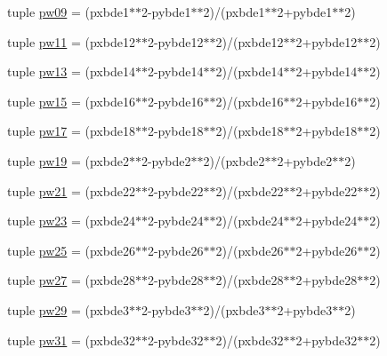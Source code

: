 \begin{DoxyCompactItemize}
tuple \mbox{\hyperlink{namespacewBDE_a9fdd797a1cbfd9f2e684cd7f94bb5d36}{pw09}} = (pxbde1$\ast$$\ast$2-\/pybde1$\ast$$\ast$2)/(pxbde1$\ast$$\ast$2+pybde1$\ast$$\ast$2)
\item 
tuple \mbox{\hyperlink{namespacewBDE_ac7ada708cdce762ea53266a496005a6b}{pw11}} = (pxbde12$\ast$$\ast$2-\/pybde12$\ast$$\ast$2)/(pxbde12$\ast$$\ast$2+pybde12$\ast$$\ast$2)
\item 
tuple \mbox{\hyperlink{namespacewBDE_a2cb987293c2c4e421b77b0fd3e73fcdd}{pw13}} = (pxbde14$\ast$$\ast$2-\/pybde14$\ast$$\ast$2)/(pxbde14$\ast$$\ast$2+pybde14$\ast$$\ast$2)
\item 
tuple \mbox{\hyperlink{namespacewBDE_a7ce3a81ee30a26faabbcf4f332990938}{pw15}} = (pxbde16$\ast$$\ast$2-\/pybde16$\ast$$\ast$2)/(pxbde16$\ast$$\ast$2+pybde16$\ast$$\ast$2)
\item 
tuple \mbox{\hyperlink{namespacewBDE_a8b3f5d727661f4517152d89a6cb63acf}{pw17}} = (pxbde18$\ast$$\ast$2-\/pybde18$\ast$$\ast$2)/(pxbde18$\ast$$\ast$2+pybde18$\ast$$\ast$2)
\item 
tuple \mbox{\hyperlink{namespacewBDE_abdf30b60d0eab014a0b9cd06acfd46c8}{pw19}} = (pxbde2$\ast$$\ast$2-\/pybde2$\ast$$\ast$2)/(pxbde2$\ast$$\ast$2+pybde2$\ast$$\ast$2)
\item 
tuple \mbox{\hyperlink{namespacewBDE_af91a013b5ba263180cbf77003f2f7dc2}{pw21}} = (pxbde22$\ast$$\ast$2-\/pybde22$\ast$$\ast$2)/(pxbde22$\ast$$\ast$2+pybde22$\ast$$\ast$2)
\item 
tuple \mbox{\hyperlink{namespacewBDE_a4cba7bb4892e8c8edb438de8e34ad3a8}{pw23}} = (pxbde24$\ast$$\ast$2-\/pybde24$\ast$$\ast$2)/(pxbde24$\ast$$\ast$2+pybde24$\ast$$\ast$2)
\item 
tuple \mbox{\hyperlink{namespacewBDE_a2d9e83e6b7b7e89d242260ac9afc328c}{pw25}} = (pxbde26$\ast$$\ast$2-\/pybde26$\ast$$\ast$2)/(pxbde26$\ast$$\ast$2+pybde26$\ast$$\ast$2)
\item 
tuple \mbox{\hyperlink{namespacewBDE_a8255676c34cd4e8796aaa4e7dd21c8cf}{pw27}} = (pxbde28$\ast$$\ast$2-\/pybde28$\ast$$\ast$2)/(pxbde28$\ast$$\ast$2+pybde28$\ast$$\ast$2)
\item 
tuple \mbox{\hyperlink{namespacewBDE_a6a36336925bbc0472e3b3b20efce6b2b}{pw29}} = (pxbde3$\ast$$\ast$2-\/pybde3$\ast$$\ast$2)/(pxbde3$\ast$$\ast$2+pybde3$\ast$$\ast$2)
\item 
tuple \mbox{\hyperlink{namespacewBDE_a46201594a81c5e3eef97e0786f166d87}{pw31}} = (pxbde32$\ast$$\ast$2-\/pybde32$\ast$$\ast$2)/(pxbde32$\ast$$\ast$2+pybde32$\ast$$\ast$2)
\item 

\end{DoxyCompactItemize}
